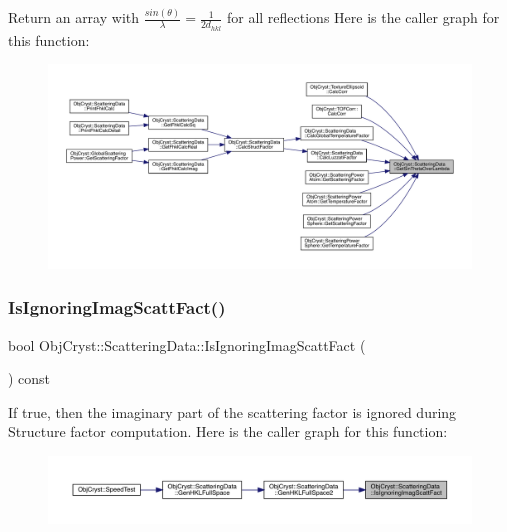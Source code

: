 Return an array with $ \frac{sin(\theta)}{\lambda} = \frac{1}{2d_{hkl}}$ for all reflections Here is the caller graph for this function\+:
\nopagebreak
\begin{figure}[H]
\begin{center}
\leavevmode
\includegraphics[width=350pt]{class_obj_cryst_1_1_scattering_data_a27cf813d222bbc0b261f794051125219_icgraph}
\end{center}
\end{figure}
\mbox{\label{class_obj_cryst_1_1_scattering_data_a441dc936d43ef67428a69c0090448bf1}} 
\subsubsection{\texorpdfstring{IsIgnoringImagScattFact()}{IsIgnoringImagScattFact()}}
{\footnotesize\ttfamily bool Obj\+Cryst\+::\+Scattering\+Data\+::\+Is\+Ignoring\+Imag\+Scatt\+Fact (\begin{DoxyParamCaption}{ }\end{DoxyParamCaption}) const}

If true, then the imaginary part of the scattering factor is ignored during Structure factor computation. Here is the caller graph for this function\+:
\nopagebreak
\begin{figure}[H]
\begin{center}
\leavevmode
\includegraphics[width=350pt]{class_obj_cryst_1_1_scattering_data_a441dc936d43ef67428a69c0090448bf1_icgraph}
\end{center}
\end{figure}
\mbox{\label{class_obj_cryst_1_1_scattering_data_a19b6958c0420a7e8dca0664c19f5f2f4}} 
